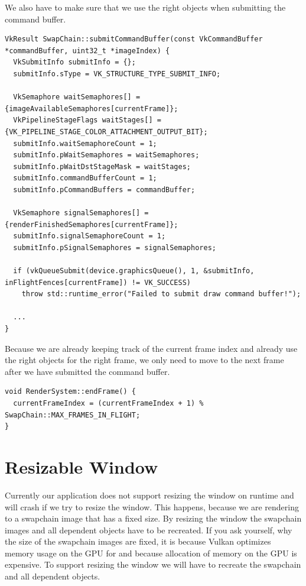 \documentclass[12pt]{report} \usepackage{preamble}
\begin{document}
We also have to make sure that we use the right objects when submitting the command buffer.

\begin{lstlisting}[Language=C++]
VkResult SwapChain::submitCommandBuffer(const VkCommandBuffer *commandBuffer, uint32_t *imageIndex) {
  VkSubmitInfo submitInfo = {};
  submitInfo.sType = VK_STRUCTURE_TYPE_SUBMIT_INFO;

  VkSemaphore waitSemaphores[] = {imageAvailableSemaphores[currentFrame]};
  VkPipelineStageFlags waitStages[] = {VK_PIPELINE_STAGE_COLOR_ATTACHMENT_OUTPUT_BIT};
  submitInfo.waitSemaphoreCount = 1;
  submitInfo.pWaitSemaphores = waitSemaphores;
  submitInfo.pWaitDstStageMask = waitStages;
  submitInfo.commandBufferCount = 1;
  submitInfo.pCommandBuffers = commandBuffer;

  VkSemaphore signalSemaphores[] = {renderFinishedSemaphores[currentFrame]};
  submitInfo.signalSemaphoreCount = 1;
  submitInfo.pSignalSemaphores = signalSemaphores;

  if (vkQueueSubmit(device.graphicsQueue(), 1, &submitInfo, inFlightFences[currentFrame]) != VK_SUCCESS)
    throw std::runtime_error("Failed to submit draw command buffer!");

  ...
}
\end{lstlisting}

Because we are already keeping track of the current frame index and already use the right objects for the right frame, we only need to
move to the next frame after we have submitted the command buffer.

\begin{lstlisting}[Language=C++]
void RenderSystem::endFrame() {
  currentFrameIndex = (currentFrameIndex + 1) % SwapChain::MAX_FRAMES_IN_FLIGHT;
}
\end{lstlisting}

\section{Resizable Window}

Currently our application does not support resizing the window on runtime and will crash if we try to resize the window. This
happens, because we are rendering to a swapchain image that has a fixed size. By resizing the window the swapchain images and all
dependent objects have to be recreated. If you ask yourself, why the size of the swapchain images are fixed, it is because
Vulkan optimizes memory usage on the GPU for and because allocation of memory on the GPU is expensive. To support resizing the window
we will have to recreate the swapchain and all dependent objects.
\end{document}
